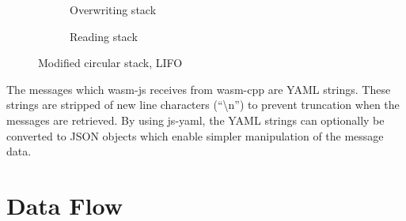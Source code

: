 \begin{figure}[htbp]
\begin{subfigure}[t]{0.32\textwidth}
            \caption{Overwriting stack}
        \end{subfigure}
        \begin{subfigure}[t]{0.32\textwidth}
            \centering
            \caption{Reading stack}
        \end{subfigure}
        \vspace{1em}
        \caption{Modified circular stack, \ac{LIFO}}
        \label{fig:msgStack}
    \end{figure}

    The messages which \textsf{wasm-js} receives from \textsf{wasm-cpp} are \ac{YAML} strings. These strings are stripped of new line characters (\textsf{``\textbackslash n''}) to prevent truncation when the messages are retrieved. By using \textsf{js-yaml}, the \ac{YAML} strings can optionally be converted to \ac{JSON} objects which enable simpler manipulation of the message data.

\section{Data Flow}

